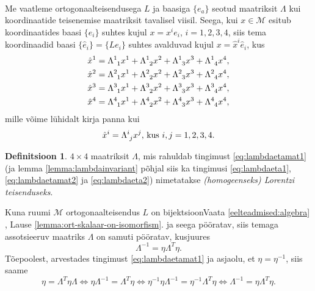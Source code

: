 \documentclass[12pt,a4paper,oneside]{article}
\theoremstyle{plain}
\theoremstyle{definition}
\newtheorem{definitsioon}{Definitsioon}[section]
\numberwithin{equation}{section}
\def\M{{\mathcal M}}
\begin{document}
\paragraph*{}
Me vaatleme ortogonaalteisendusega $L$ ja baasiga $\{e_a\}$ seotud 
maatriksit $\Lambda$ kui koordinaatide teisenemise maatriksit 
tavalisel viisil. Seega, kui $x \in \M$ esitub koordinaatides 
baasi $\{e_i\}$ suhtes kujul $x = x^i e_i$, $i = 1, 2, 3, 4$, siis 
tema koordinaadid baasi $\{\hat{e}_i\} = \{Le_i\}$ suhtes avalduvad 
kujul $x = \hat{x}^i \hat{e}_i$, kus
\begin{align*}
\hat{x}^1 &= \Lambda\indices{^1_1} x^1 + \Lambda\indices{^1_2} x^2 + 
\Lambda\indices{^1_3} x^3 + \Lambda\indices{^1_4} x^4, \\
\hat{x}^2 &= \Lambda\indices{^2_1} x^1 + \Lambda\indices{^2_2} x^2 + 
\Lambda\indices{^2_3} x^3 + \Lambda\indices{^2_4} x^4, \\
\hat{x}^3 &= \Lambda\indices{^3_1} x^1 + \Lambda\indices{^3_2} x^2 + 
\Lambda\indices{^3_3} x^3 + \Lambda\indices{^3_4} x^4, \\
\hat{x}^4 &= \Lambda\indices{^4_1} x^1 + \Lambda\indices{^4_2} x^2 + 
\Lambda\indices{^4_3} x^3 + 
\Lambda\indices{^4_4} x^4,
\end{align*}
mille võime lühidalt kirja panna kui
\begin{equation*}
\hat{x}^i = \Lambda\indices{^i_j} x^j \text{, kus } i,j=1, 2, 3, 4.
\end{equation*}

\begin{definitsioon}
$4 \times 4$ maatriksit $\Lambda$, mis rahuldab tingimust 
\ref{eq:lambdaetamat1} (ja lemma \ref{lemma:lambdainvariant} 
põhjal siis ka tingimusi \ref{eq:lambdaeta1}, \ref{eq:lambdaetamat2} 
ja \ref{eq:lambdaeta2}) nimetatakse \emph{(homogeenseks) Lorentzi 
teisenduseks}.
\end{definitsioon}

Kuna ruumi $\M$ ortogonaalteisendus $L$ on bijektsioon{
{Vaata \ref{eelteadmised:algebra} 
, Lause 
\ref{lemma:ort-skalaar-on-isomorfism}.}} 
ja seega pööratav, siis temaga assotsieeruv maatriks $\Lambda$ on 
samuti pööratav, kusjuures
\begin{equation} \label{eq:lambda-1lambda-trans}
\Lambda^{-1} = \eta \Lambda^T \eta.
\end{equation}
Tõepoolest, arvestades tingimust \ref{eq:lambdaetamat1} ja asjaolu, 
et $\eta = \eta^{-1}$, siis saame
\begin{equation*}
\eta = \Lambda^T \eta \Lambda \iff \eta \Lambda^{-1} = 
\Lambda^T \eta \iff \eta^{-1} \eta \Lambda^{-1} = 
\eta^{-1} \Lambda^T \eta \iff \Lambda^{-1} = \eta \Lambda^T \eta.
\end{equation*}
\end{document}
